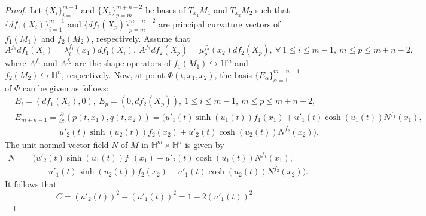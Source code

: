 \documentclass[reqno]{amsart}%
\theoremstyle{definition}
\numberwithin{equation}{section}
\begin{document}
\begin{proof}
Let $\{X_i\}_{i=1}^{m-1}$ and $\{X_p\}_{p=m}^{m+n-2}$ be bases of $T_{x_1}M_1$ and $T_{x_2}M_2$ such that $\{df_1(X_i)\}_{i=1}^{m-1}$ and $\{df_2(X_p)\}_{p=m}^{m+n-2}$ are 
principal curvature vectors of $f_1(M_1)$ and $f_2(M_2)$, respectively. Assume that 
$$
A^{f_1}df_1(X_i)=\lambda^{f_1}_i(x_1)df_1(X_i),\ A^{f_2}df_2(X_p)=\mu^{f_2}_p(x_2)df_2(X_p),\ \forall \ 
1\leq i \leq m-1,\ m\leq p \leq m+n-2, 
$$
where $A^{f_1}$ and $A^{f_2}$ are the shape operators of $f_1(M_1)\hookrightarrow\mathbb{H}^m$ and $f_2(M_2)\hookrightarrow\mathbb{H}^n$,  respectively.
Now, at point $\Phi(t,x_1,x_2)$, the basis $\{E_\alpha\}_{\alpha=1}^{m+n-1}$ of $\Phi$ can be given as follows:
%
\begin{equation*}
	\begin{aligned}
		&E_i=\left(df_1(X_i),0\right),\ 
		E_p=\left(0,df_2(X_p)\right), \ 
		1\leq i \leq m-1,\ m\leq p \leq m+n-2, \\ 
		&E_{m+n-1}=\tfrac{\partial}{\partial t}(p(t,x_1),q(t,x_2))
		=\big(u'_{1}(t)\sinh(u_1(t))f_1(x_1)
		+u'_{1}(t)\cosh(u_1(t))N^{f_1}(x_1),\\
		&~~~~~~~~~~~~~~~~~~~~~~~~   u'_{2}(t)\sinh(u_2(t))f_2(x_2)
		+u'_{2}(t)\cosh(u_2(t))N^{f_2}(x_2)\big).
	\end{aligned}
\end{equation*}
The unit normal vector field $N$ of $M$ in $\mathbb{H}^m\times \mathbb{H}^n$ is given by
%
\begin{equation}\label{eqn:apx3.3}
	\begin{aligned}
		N=&\big(u'_{2}(t)\sinh(u_1(t))f_1(x_1)
		+u'_{2}(t)\cosh(u_1(t))N^{f_1}(x_1),\\
		&\ \ \ -u'_{1}(t)\sinh(u_2(t))f_2(x_2)
		-u'_{1}(t)\cosh(u_2(t))N^{f_2}(x_2)\big).
	\end{aligned}
\end{equation}
%
It follows that
%
\begin{equation}\label{eqn:apxCC}
	C=(u'_{2}(t))^2-(u'_{1}(t))^2=1-2(u'_{1}(t))^2.
\end{equation}
%


\end{proof}
\end{document}
